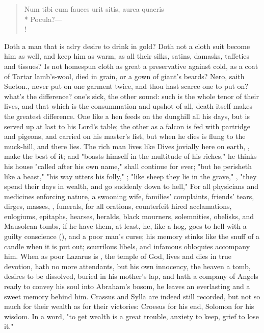 {\begin{latin}
\begin{verse}%
Num tibi cum fauces urit sitis, aurea quaeris\\*
Pocula?---\\!
\end{verse}%
\end{latin}
%

Doth a man that is adry desire to drink in gold? Doth not a cloth suit become him as well, and keep him as warm, as all their silks, satins, damasks, taffeties and tissues? Is not homespun cloth as great a preservative against cold, as a coat of Tartar lamb's-wool, died in grain, or a gown of giant's beards? Nero, saith Sueton., never put on one garment twice, and thou hast scarce one to put on? what's the difference? one's sick, the other sound: such is the whole tenor of their lives, and that which is the consummation and upshot of all, death itself makes the greatest difference. One like a hen feeds on the dunghill all his days, but is served up at last to his Lord's table; the other as a falcon is fed with partridge and pigeons, and carried on his master's fist, but when he dies is flung to the muck-hill, and there lies. The rich man lives like Dives jovially here on earth, , make the best of it; and "boasts himself in the multitude of his riches,"  he thinks his house "called after his own name," shall continue for ever; "but he perisheth like a beast,"  "his way utters his folly,"  ; "like sheep they lie in the grave,"  , "they spend their days in wealth, and go suddenly down to hell,"  For all physicians and medicines enforcing nature, a swooning wife, families' complaints, friends' tears, dirges, masses, , funerals, for all orations, counterfeit hired acclamations, eulogiums, epitaphs, hearses, heralds, black mourners, solemnities, obelisks, and Mausolean tombs, if he have them, at least, he, like a hog, goes to hell with a guilty conscience (), and a poor man's curse; his memory stinks like the snuff of a candle when it is put out; scurrilous libels, and infamous obloquies accompany him. When as poor Lazarus is , the temple of God, lives and dies in true devotion, hath no more attendants, but his own innocency, the heaven a tomb, desires to be dissolved, buried in his mother's lap, and hath a company of Angels ready to convey his soul into Abraham's bosom, he leaves an everlasting and a sweet memory behind him. Crassus and Sylla are indeed still recorded, but not so much for their wealth as for their victories: Croesus for his end, Solomon for his wisdom. In a word, "to get wealth is a great trouble, anxiety to keep, grief to lose it."

}
